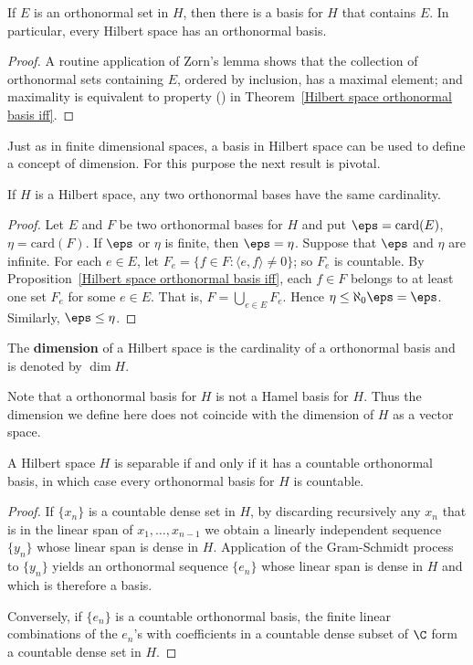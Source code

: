 \begin{proposition}\label{Hilbert space orthonormal basis exist}
If $E$ is an orthonormal set in $H$, then there is a basis for $H$ that contains $E$. In particular, every Hilbert space has an orthonormal basis.
\end{proposition}
\begin{proof}
A routine application of Zorn's lemma shows that the collection of orthonormal sets containing $E$, ordered by inclusion, has a maximal element; and maximality is equivalent to property () in Theorem~\ref{Hilbert space orthonormal basis iff}.
\end{proof}
Just as in finite dimensional spaces, a basis in Hilbert space can be used to define a concept of dimension. For this purpose the next result is pivotal.
\begin{proposition}\label{Hilbert space orthonormal basis card}
If $H$ is a Hilbert space, any two orthonormal bases have the same cardinality.
\end{proposition}
\begin{proof}
Let $E$ and $F$ be two orthonormal bases for $H$ and put $\eps=\mathrm{card}(E)$, $\eta=\mathrm{card}(F)$. If $\eps$ or $\eta$ is finite, then $\eps=\eta$. Suppose that $\eps$ and $\eta$ are infinite. For each $e\in E$, let $F_e=\{f\in F:\langle e,f\rangle\neq 0\}$; so $F_e$ is countable. By Proposition~\ref{Hilbert space orthonormal basis iff}, each $f\in F$ belongs to at least one set $F_e$ for some $e\in E$. That is, $F=\bigcup_{e\in E}F_e$. Hence $\eta\leq\aleph_0\eps=\eps$. Similarly, $\eps\leq\eta$.
\end{proof}
\begin{definition}
The \textbf{dimension} of a Hilbert space is the cardinality of a orthonormal basis and is denoted by $\dim H$.
\end{definition}
Note that a orthonormal basis for $H$ is not a Hamel basis for $H$. Thus the dimension we define here does not coincide with the dimension of $H$ as a vector space.
\begin{proposition}\label{Hilbert space separable iff}
A Hilbert space $H$ is separable if and only if it has a countable orthonormal basis, in which case every orthonormal basis for $H$ is countable.
\end{proposition}
\begin{proof}
If $\{x_n\}$ is a countable dense set in $H$, by discarding recursively any $x_n$ that is in the linear span of $x_1,\dots,x_{n-1}$ we obtain a linearly independent sequence $\{y_n\}$ whose linear span is dense in $H$. Application of the Gram-Schmidt process to $\{y_n\}$ yields an orthonormal sequence $\{e_n\}$ whose linear span is dense in $H$ and which is therefore a basis.\par
Conversely, if $\{e_n\}$ is a countable orthonormal basis, the finite linear combinations of the $e_n$'s with coefficients in a countable dense subset of $\C$ form a countable dense set in $H$.
\end{proof}
